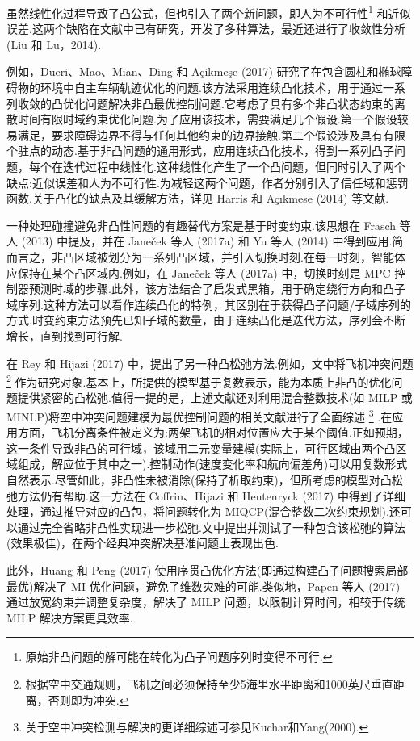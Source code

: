 \documentclass[10pt]{article}
\begin{document}
虽然线性化过程导致了凸公式，但也引入了两个新问题，即人为不可行性\footnote{原始非凸问题的解可能在转化为凸子问题序列时变得不可行.} 和近似误差.这两个缺陷在文献中已有研究，开发了多种算法，最近还进行了收敛性分析(Liu 和 Lu，2014).

例如，Dueri、Mao、Mian、Ding 和 Açikmeşe (2017) 研究了在包含圆柱和椭球障碍物的环境中自主车辆轨迹优化的问题.该方法采用连续凸化技术，用于通过一系列收敛的凸优化问题解决非凸最优控制问题.它考虑了具有多个非凸状态约束的离散时间有限时域约束优化问题.为了应用该技术，需要满足几个假设.第一个假设较易满足，要求障碍边界不得与任何其他约束的边界接触.第二个假设涉及具有有限个驻点的动态.基于非凸问题的通用形式，应用连续凸化技术，得到一系列凸子问题，每个在迭代过程中线性化.这种线性化产生了一个凸问题，但同时引入了两个缺点:近似误差和人为不可行性.为减轻这两个问题，作者分别引入了信任域和惩罚函数.关于凸化的缺点及其缓解方法，详见 Harris 和 Açıkmese (2014) 等文献.

一种处理碰撞避免非凸性问题的有趣替代方案是基于时变约束.该思想在 Frasch 等人 (2013) 中提及，并在 Janeček 等人 (2017a) 和 Yu 等人 (2014) 中得到应用.简而言之，非凸区域被划分为一系列凸区域，并引入切换时刻.在每一时刻，智能体应保持在某个凸区域内.例如，在 Janeček 等人 (2017a) 中，切换时刻是 MPC 控制器预测时域的步骤.此外，该方法结合了启发式黑箱，用于确定绕行方向和凸子域序列.这种方法可以看作连续凸化的特例，其区别在于获得凸子问题/子域序列的方式.时变约束方法预先已知子域的数量，由于连续凸化是迭代方法，序列会不断增长，直到找到可行解.

在 Rey 和 Hijazi (2017) 中，提出了另一种凸松弛方法.例如，文中将飞机冲突问题\footnote{根据空中交通规则，飞机之间必须保持至少5海里水平距离和1000英尺垂直距离，否则即为冲突.} 作为研究对象.基本上，所提供的模型基于复数表示，能为本质上非凸的优化问题提供紧密的凸松弛.值得一提的是，上述文献还对利用混合整数技术(如 MILP 或 MINLP)将空中冲突问题建模为最优控制问题的相关文献进行了全面综述 \footnote{关于空中冲突检测与解决的更详细综述可参见Kuchar和Yang(2000).} .在应用方面，飞机分离条件被定义为:两架飞机的相对位置应大于某个阈值.正如预期，这一条件导致非凸的可行域，该域用二元变量建模(实际上，可行区域由两个凸区域组成，解应位于其中之一).控制动作(速度变化率和航向偏差角)可以用复数形式自然表示.尽管如此，非凸性未被消除(保持了析取约束)，但所考虑的模型对凸松弛方法仍有帮助.这一方法在 Coffrin、Hijazi 和 Hentenryck (2017) 中得到了详细处理，通过推导对应的凸包，将问题转化为 MIQCP(混合整数二次约束规划).还可以通过完全省略非凸性实现进一步松弛.文中提出并测试了一种包含该松弛的算法(效果极佳)，在两个经典冲突解决基准问题上表现出色.

此外，Huang 和 Peng (2017) 使用序贯凸优化方法(即通过构建凸子问题搜索局部最优)解决了 MI 优化问题，避免了维数灾难的可能.类似地，Papen 等人 (2017) 通过放宽约束并调整复杂度，解决了 MILP 问题，以限制计算时间，相较于传统 MILP 解决方案更具效率.
\end{document}
